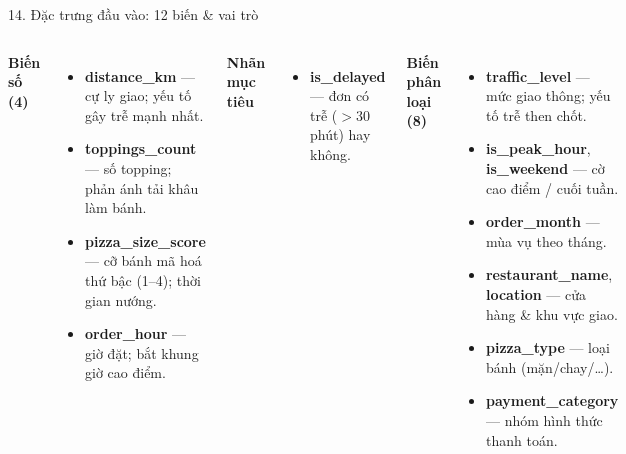 \documentclass[t, aspectratio=169, 11pt]{beamer}
\newcommand{\blk}[1]{\textbf{\color{hustprimary}#1}}
\begin{document}
\begin{frame}{14. Đặc trưng đầu vào: 12 biến \& vai trò}
    \begin{columns}[T]
        \blk{Biến số (4)}
        \begin{itemize}\footnotesize
            \item \textbf{distance\_km} — cự ly giao; yếu tố gây trễ mạnh nhất.
            \item \textbf{toppings\_count} — số topping; phản ánh tải khâu làm bánh.
            \item \textbf{pizza\_size\_score} — cỡ bánh mã hoá thứ bậc (1--4); thời gian nướng.
            \item \textbf{order\_hour} — giờ đặt; bắt khung giờ cao điểm.
        \end{itemize}
        \vspace{0.1cm}
        \blk{Nhãn mục tiêu}
        \begin{itemize}\footnotesize
            \item \textbf{is\_delayed} — đơn có trễ ($>30$ phút) hay không.
        \end{itemize}

        \blk{Biến phân loại (8)}
        \begin{itemize}\footnotesize
            \item \textbf{traffic\_level} — mức giao thông; yếu tố trễ then chốt.
            \item \textbf{is\_peak\_hour}, \textbf{is\_weekend} — cờ cao điểm / cuối tuần.
            \item \textbf{order\_month} — mùa vụ theo tháng.
            \item \textbf{restaurant\_name}, \textbf{location} — cửa hàng \& khu vực giao.
            \item \textbf{pizza\_type} — loại bánh (mặn/chay/\dots).
            \item \textbf{payment\_category} — nhóm hình thức thanh toán.
        \end{itemize}
    \end{columns}
\end{frame}
\end{document}
